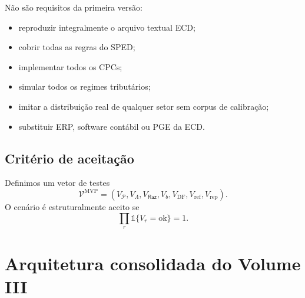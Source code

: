 \documentclass[11pt,a4paper]{article}
\newcommand{\ind}{\mathds{1}}
\newcommand{\Plano}{\mathcal{P}}
\newcommand{\Raz}{\mathsf{Raz}}
\begin{document}
Não são requisitos da primeira versão:
\begin{itemize}
    \item reproduzir integralmente o arquivo textual ECD;
    \item cobrir todas as regras do SPED;
    \item implementar todos os CPCs;
    \item simular todos os regimes tributários;
    \item imitar a distribuição real de qualquer setor sem corpus de calibração;
    \item substituir ERP, software contábil ou PGE da ECD.
\end{itemize}

\subsection{Critério de aceitação}

Definimos um vetor de testes
\begin{equation}
\boxed{
\mathcal V^{\mathrm{MVP}}
=(V_{\Plano},V_{\Lambda},V_{\Raz},V_b,V_{\mathrm{DF}},V_{\mathrm{ref}},V_{\mathrm{rep}}).
}
\end{equation}
O cenário é estruturalmente aceito se
\begin{equation}
\boxed{
\prod_{r} \ind\{V_r=\mathrm{ok}\}=1.
}
\end{equation}

\section{Arquitetura consolidada do Volume III}
\end{document}
